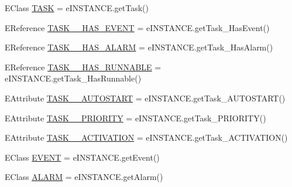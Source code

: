 \begin{DoxyCompactItemize}
\item 
E\-Class \hyperlink{interfaceshootingmachineemfmodel_1_1_shootingmachineemfmodel_package_1_1_literals_ac7af0c94116439dc2bbf03b03620d74e}{T\-A\-S\-K} = e\-I\-N\-S\-T\-A\-N\-C\-E.\-get\-Task()
\item 
E\-Reference \hyperlink{interfaceshootingmachineemfmodel_1_1_shootingmachineemfmodel_package_1_1_literals_a3ce372c79cc7d3893756d575f849f232}{T\-A\-S\-K\-\_\-\-\_\-\-H\-A\-S\-\_\-\-E\-V\-E\-N\-T} = e\-I\-N\-S\-T\-A\-N\-C\-E.\-get\-Task\-\_\-\-Has\-Event()
\item 
E\-Reference \hyperlink{interfaceshootingmachineemfmodel_1_1_shootingmachineemfmodel_package_1_1_literals_a765d7ba7a3095109fbd494db4df0967e}{T\-A\-S\-K\-\_\-\-\_\-\-H\-A\-S\-\_\-\-A\-L\-A\-R\-M} = e\-I\-N\-S\-T\-A\-N\-C\-E.\-get\-Task\-\_\-\-Has\-Alarm()
\item 
E\-Reference \hyperlink{interfaceshootingmachineemfmodel_1_1_shootingmachineemfmodel_package_1_1_literals_a8179b43f089e2fe704940ce814273d02}{T\-A\-S\-K\-\_\-\-\_\-\-H\-A\-S\-\_\-\-R\-U\-N\-N\-A\-B\-L\-E} = e\-I\-N\-S\-T\-A\-N\-C\-E.\-get\-Task\-\_\-\-Has\-Runnable()
\item 
E\-Attribute \hyperlink{interfaceshootingmachineemfmodel_1_1_shootingmachineemfmodel_package_1_1_literals_afd79e5d39bbbc1e8abfc2a8972ffb89f}{T\-A\-S\-K\-\_\-\-\_\-\-A\-U\-T\-O\-S\-T\-A\-R\-T} = e\-I\-N\-S\-T\-A\-N\-C\-E.\-get\-Task\-\_\-\-A\-U\-T\-O\-S\-T\-A\-R\-T()
\item 
E\-Attribute \hyperlink{interfaceshootingmachineemfmodel_1_1_shootingmachineemfmodel_package_1_1_literals_a6860394b9f9e403b44382ad8d19b97b3}{T\-A\-S\-K\-\_\-\-\_\-\-P\-R\-I\-O\-R\-I\-T\-Y} = e\-I\-N\-S\-T\-A\-N\-C\-E.\-get\-Task\-\_\-\-P\-R\-I\-O\-R\-I\-T\-Y()
\item 
E\-Attribute \hyperlink{interfaceshootingmachineemfmodel_1_1_shootingmachineemfmodel_package_1_1_literals_a65c54662ff66e19e120f5c6774c3b06e}{T\-A\-S\-K\-\_\-\-\_\-\-A\-C\-T\-I\-V\-A\-T\-I\-O\-N} = e\-I\-N\-S\-T\-A\-N\-C\-E.\-get\-Task\-\_\-\-A\-C\-T\-I\-V\-A\-T\-I\-O\-N()
\item 
E\-Class \hyperlink{interfaceshootingmachineemfmodel_1_1_shootingmachineemfmodel_package_1_1_literals_a8e5ee3967fe2449de19ff6be4e31d7ec}{E\-V\-E\-N\-T} = e\-I\-N\-S\-T\-A\-N\-C\-E.\-get\-Event()
\item 
E\-Class \hyperlink{interfaceshootingmachineemfmodel_1_1_shootingmachineemfmodel_package_1_1_literals_a563965a1017bffb037517fdc4bd5a6d5}{A\-L\-A\-R\-M} = e\-I\-N\-S\-T\-A\-N\-C\-E.\-get\-Alarm()
\item 

\end{DoxyCompactItemize}
